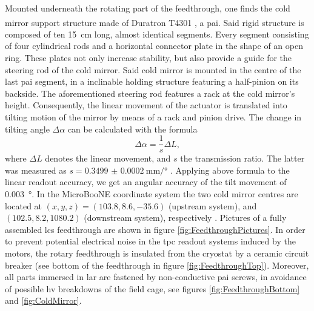Mounted underneath the rotating part of the feedthrough, one finds the cold mirror support structure made of Duratron\textsuperscript{\textregistered} T4301 \cite{LArLaserPhDMatthias}, a \gls{pai}. Said rigid structure is composed of ten \SI{15}{\centi\metre} long, almost identical segments. Every segment consisting of four cylindrical rods and a horizontal connector plate in the shape of an open ring. These plates not only increase stability, but also provide a guide for the steering rod of the cold mirror. Said cold mirror is mounted in the centre of the last \gls{pai} segment, in a inclinable holding structure featuring a half-pinion on its backside. The aforementioned steering rod features a rack at the cold mirror's height. Consequently, the linear movement of the actuator is translated into tilting motion of the mirror by means of a rack and pinion drive. The change in tilting angle $\Delta\alpha$ can be calculated with the formula
\begin{equation}
    \Delta\alpha = \frac{1}{s} \Delta L,
\end{equation}
where $\Delta L$ denotes the linear movement, and $s$ the transmission ratio. The latter was measured as $s = \SI[per-mode = symbol]{ 0.3499(2)}{\milli\metre\per\degree}$ \cite{LArLaserPhDMatthias}. Applying above formula to the linear readout accuracy, we get an angular accuracy of the tilt movement of \SI{0.003}{\degree}. In the MicroBooNE coordinate system the two cold mirror centres are located at $(x,y,z) = (\num{103.8},\num{8.6},\num{-35.6})$ (upstream system), and $(\num{102.5},\num{8.2},\num{1080.2})$ (downstream system), respectively \cite{LArLaserMicroBooNE2}. Pictures of a fully assembled \gls{lcs} feedthrough are shown in figure \ref{fig:FeedthroughPictures}. In order to prevent potential electrical noise in the \gls{tpc} readout systems induced by the motors, the rotary feedthrough is insulated from the cryostat by a ceramic circuit breaker (see bottom of the feedthrough in figure \ref{fig:FeedthroughTop}). Moreover, all parts immersed in \gls{lar} are fastened by non-conductive \gls{pai} screws, in avoidance of possible \gls{hv} breakdowns of the field cage, see figures \ref{fig:FeedthroughBottom} and \ref{fig:ColdMirror}.
